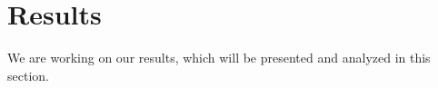 
\section{Results}
\label{sec:results}

We are working on our results, which will be presented and analyzed in this section. 
